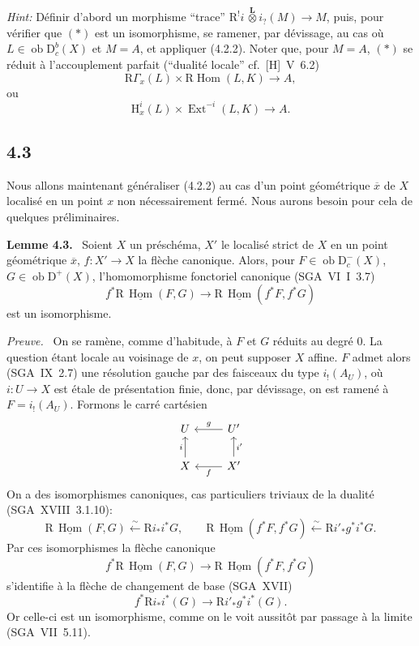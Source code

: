 \documentclass[11pt]{article}
\newenvironment{statement}[1]{\par\medskip\noindent\textbf{#1.}\ }{\par\medskip}
\newenvironment{prooftext}[1][Proof]{\par\noindent\emph{#1.}\ }{\par\medskip}
\renewcommand{\H}{\mathrm{H}}
\DeclareMathOperator{\Hom}{Hom}
\DeclareMathOperator{\Ext}{Ext}
\newcommand{\R}{\mathrm{R}}
\newcommand{\D}{\mathrm{D}}
\newcommand{\ob}{\operatorname{ob}}
\newcommand{\ol}[1]{\overline{#1}}
\providecommand{\Hom}{\operatorname{Hom}}
\providecommand{\ob}{\operatorname{ob}}
\providecommand{\R}{\mathrm R}
\begin{document}
\emph{Hint:} Définir d'abord un morphisme ``trace'' $\R^{!}i\,\overset{\mathbf L}{\otimes}i_?(M)\to M$, puis, pour vérifier que $(*)$ est un isomorphisme, se ramener, par dévissage, au cas où $L\in\ob\D_c^b(X)$ et $M=A$, et appliquer (4.2.2). Noter que, pour $M=A$, $(*)$ se réduit à l'accouplement parfait (``dualité locale'' cf.~[H]~V~6.2)
\[
\R\Gamma_x(L)\times \R\Hom(L,K)\longrightarrow A,
\]
ou
\[
\H_x^i(L)\times \Ext^{-i}(L,K)\longrightarrow A.
\]

\subsection*{4.3}
Nous allons maintenant généraliser (4.2.2) au cas d'un point géométrique $\ol{x}$ de $X$ localisé en un point $x$ non nécessairement fermé. Nous aurons besoin pour cela de quelques préliminaires.

\begin{statement}{Lemme 4.3}
Soient $X$ un préschéma, $X'$ le localisé strict de $X$ en un point géométrique $\ol{x}$, $f:X'\to X$ la flèche canonique. Alors, pour $F\in\ob\D_c^-(X)$, $G\in\ob\D^+(X)$, l'homomorphisme fonctoriel canonique (SGA~VI~I~3.7)
\[
f^*\R\,\underline{\Hom}(F,G)\longrightarrow \R\,\underline{\Hom}(f^*F,f^*G)
\]
est un isomorphisme.
\end{statement}

\begin{prooftext}[Preuve]
On se ramène, comme d'habitude, à $F$ et $G$ réduits au degré $0$. La question étant locale au voisinage de $x$, on peut supposer $X$ affine. $F$ admet alors (SGA~IX~2.7) une résolution gauche par des faisceaux du type $i_!(A_U)$, où $i:U\to X$ est étale de présentation finie, donc, par dévissage, on est ramené à $F=i_!(A_U)$. Formons le carré cartésien
\[
\begin{tikzcd}
U & U' \arrow[l,"g"'] \\
X \arrow[u,"i"] & X' \arrow[l,"f"] \arrow[u,"i'"']
\end{tikzcd}
\]
On a des isomorphismes canoniques, cas particuliers triviaux de la dualité (SGA~XVIII~3.1.10):
\[
\R\,\underline{\Hom}(F,G)\xleftarrow{\sim}\R i_* i^*G,
\qquad
\R\,\underline{\Hom}(f^*F,f^*G)\xleftarrow{\sim}\R i'_* g^*i^*G.
\]
Par ces isomorphismes la flèche canonique
\[
f^*\R\,\underline{\Hom}(F,G)\longrightarrow \R\,\underline{\Hom}(f^*F,f^*G)
\]
s'identifie à la flèche de changement de base (SGA~XVII)
\[
f^*\R i_*i^*(G)\longrightarrow \R i'_*g^*i^*(G).
\]
Or celle-ci est un isomorphisme, comme on le voit aussitôt par passage à la limite (SGA~VII~5.11).
\end{prooftext}
\end{document}
